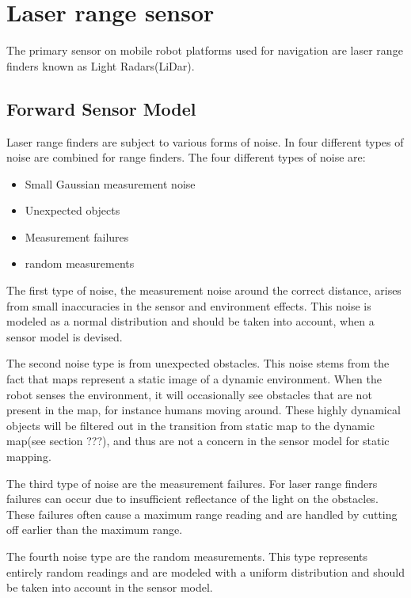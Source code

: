\section{Laser range sensor}

The primary sensor on mobile robot platforms used for navigation are laser range finders known as Light Radars(LiDar). 

\subsection{Forward Sensor Model}
Laser range finders are subject to various forms of noise. In \cite{probRob} four different types of noise are combined for range finders. 
The four different types of noise are:

\begin{itemize}
	\item Small Gaussian measurement noise
	\item Unexpected objects
	\item Measurement failures
	\item random measurements
\end{itemize}


The first type of noise, the measurement noise around the correct distance, arises from small inaccuracies in the sensor and environment effects. This noise is modeled as a normal distribution and should be taken into account, when a sensor model is devised. 

The second noise type is from unexpected obstacles. This noise stems from the fact that maps represent a static image of a dynamic environment. When the robot senses the environment, it will occasionally see obstacles that are not present in the map, for instance humans moving around. These highly dynamical objects will be filtered out in the transition from static map to the dynamic map(see section ???), and thus are not a concern in the sensor model for static mapping.

The third type of noise are the measurement failures. 
For laser range finders failures can occur due to insufficient reflectance of the light on the obstacles. 
These failures often cause a maximum range reading and are handled by cutting off earlier than the maximum range.

The fourth noise type are the random measurements. This type represents entirely random readings and are modeled with a uniform distribution and should be taken into account in the sensor model.

